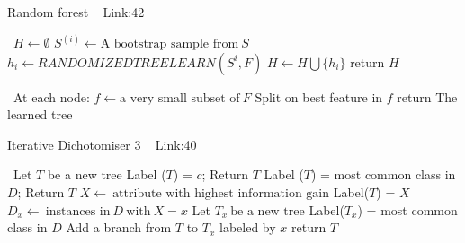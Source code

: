 \documentclass[a4paper]{article}
\begin{document}
  \begin{algorithm}
   \caption{Random forest ~\cite{randomforest1} Link:{42} }
    \begin{algorithmic}[1]
      \
      \State $H \leftarrow  \emptyset $
            \State $S^{(i)}\leftarrow \text{A bootstrap sample from} \  S $
            \State $h_i \leftarrow RANDOMIZEDTREELEARN(S^{i},F)$
            \State $H \leftarrow H \bigcup \{h_i\}$
        \EndFor
        \State return $H$
        
        
         



 \EndFunction

  \ 
  \State At each node:
  \State $f \leftarrow \text{a very small subset of} \ F $
  \State Split on best feature in $f$
  \State return The learned tree
   \EndFunction

\end{algorithmic}
\end{algorithm}







  \begin{algorithm}
   \caption{Iterative Dichotomiser 3 ~\cite{id3algo1} Link:{40}}
    \begin{algorithmic}[1]
      \Function{ID3}{$D,X$}\
      \State Let $T$ be a new tree 
      \State Label ($T$) = $c$; Return $T$
      \EndIf
      \State Label ($T$) = most common class in $D$; Return $T$
      \EndIf
      \State $X \leftarrow \ \text{attribute with highest information gain} $
      \State Label($T$) = $X$
            \State $D_x \leftarrow \ \text{instances in} \ D \ \text{with} \ X = x $
           \State Let $T_x \ \text{be a new tree}$
           \State Label($T_x$) = most common class in $D$
           \EndIf
            \State Add a branch from $T$ to $T_x$ labeled by $x$
        \EndFor
        \State return $T$
         



 \EndFunction

 
\end{algorithmic}
\end{algorithm}
\end{document}
